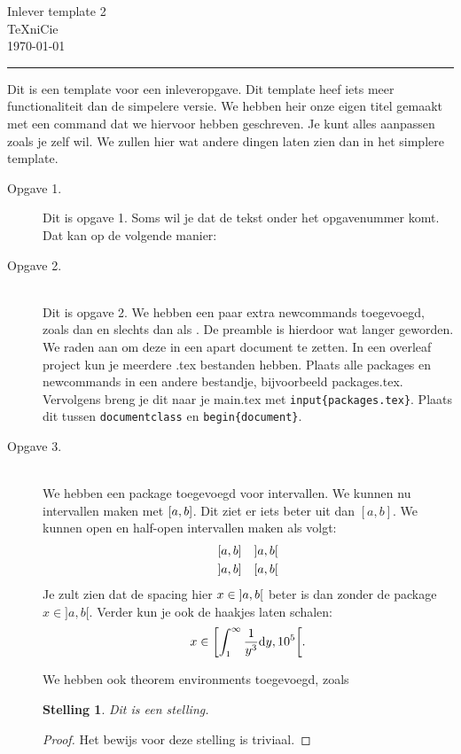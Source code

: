 \documentclass[a4paper]{article}
\newtheorem{stelling}{Stelling}
\newcommand{\desda}{dan en slechts dan als }
\renewcommand{\d}{\mathrm{d}}
\newcommand{\HandinTitle}[2]{\DTMsetdatestyle{ddmmyyyy}
\begin{center}
   { \huge #1} \\
   \vspace{4mm}
   \large{#2\\ \today}
   \vspace{4mm}
   \hrule
   \vspace{2mm}
\end{center}}
\begin{document}
\HandinTitle{Inlever template 2}{\TeX niCie}

Dit is een template voor een inleveropgave. 
Dit template heef iets meer functionaliteit dan de simpelere versie.
We hebben heir onze eigen titel gemaakt met een command dat we hiervoor hebben geschreven.
Je kunt alles aanpassen zoals je zelf wil.
We zullen hier wat andere dingen laten zien dan in het simplere template. 

\begin{description}
    \item[Opgave 1.] Dit is opgave 1. 
    Soms wil je dat de tekst onder het opgavenummer komt. Dat kan op de volgende manier: 

    \item[Opgave 2.] \hfill \\
    Dit is opgave 2. We hebben een paar extra newcommands toegevoegd, zoals 
    \desda. 
    De preamble is hierdoor wat langer geworden. 
    We raden aan om deze in een apart document te zetten.
    In een overleaf project kun je meerdere .tex bestanden hebben. 
    Plaats alle packages en newcommands in een andere bestandje, bijvoorbeeld 
    packages.tex. Vervolgens breng je dit naar je main.tex met 
    \texttt{input\{packages.tex\}}. %
    Plaats dit tussen \texttt{documentclass} en \texttt{begin\{document\}}. 

    \item[Opgave 3.] \hfill \\
    We hebben een package toegevoegd voor intervallen. 
    We kunnen nu intervallen maken met \(\interval{a}{b}\).
    Dit ziet er iets beter uit dan \([a,b]\). 
    We kunnen open en half-open intervallen maken als volgt:
    \begin{align*}
        \interval{a}{b} & &\interval[open]{a}{b} \\
        \interval[open left]{a}{b} & &\interval[open right]{a}{b}
    \end{align*}
    Je zult zien dat de spacing hier \(x \in \interval[open]{a}{b}\) 
    beter is dan zonder de package \(x \in ]a,b[ \). Verder 
    kun je ook de haakjes laten schalen: 
    \[ x \in \interval[scaled, open right]{\int_1^\infty \frac{1}{y^3} \d y}{10^5}. \]

    We hebben ook theorem environments toegevoegd, zoals 
    \begin{stelling}
        Dit is een stelling. 
    \end{stelling}
    \begin{proof}
        Het bewijs voor deze stelling is triviaal.
    \end{proof}


\end{description}
\end{document}
